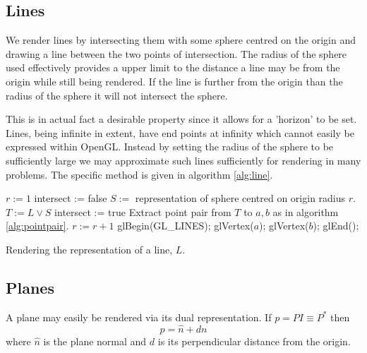 \subsection{Lines}

We render lines by intersecting them with some sphere centred on the origin
and drawing a line between the two points of intersection. The radius of the
sphere used effectively provides a upper limit to the distance a line may be
from the origin while still being rendered. If the line is further from the 
origin than the radius of the sphere it will not intersect the sphere.

This is in actual fact a desirable property since it allows for a 'horizon' to
be set. Lines, being infinite in extent, have end points at infinity which
cannot easily be expressed within OpenGL. Instead by setting the radius of the sphere
to be sufficiently large we may approximate such lines sufficiently for rendering
in many problems. The specific method is given in algorithm \ref{alg:line}.

\begin{fancyalg}
\begin{algorithmic}[1]
\STATE $r := 1$
\REPEAT
\STATE intersect := false
\STATE $S := $ representation of sphere centred on origin radius $r$.
\STATE $T := L \vee S$
\STATE intersect := true
\STATE Extract point pair from $T$ to $a,b$ as in algorithm \ref{alg:pointpair}.
\ENDIF
\STATE $r := r+1$
\STATE glBegin(GL\_LINES);
\STATE glVertex($a$); glVertex($b$);
\STATE glEnd();
\ENDIF
\end{algorithmic}
\caption{\label{alg:line}Rendering the representation of a line, $L$.}
\end{fancyalg}

%

\subsection{Planes}

A plane may easily be rendered via its dual representation\cite{wareham_lasenby}.
If $p = PI \equiv P^*$ then
\[
p = \hat{n} + dn
\]
where $\hat{n}$ is the plane normal and $d$ is its perpendicular distance from the origin.

